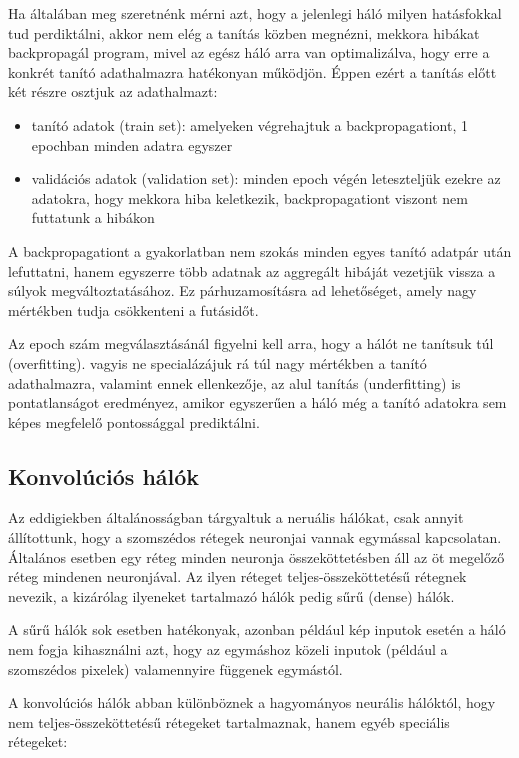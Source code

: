 \documentclass[12pt]{article}
\begin{document}
Ha általában meg szeretnénk mérni azt, hogy a jelenlegi háló milyen hatásfokkal tud perdiktálni, akkor nem elég a tanítás közben megnézni, mekkora hibákat backpropagál program, mivel az egész háló arra van optimalizálva, hogy erre a konkrét tanító adathalmazra hatékonyan működjön. Éppen ezért a tanítás előtt két részre osztjuk az adathalmazt:

\begin{itemize}  
	\item tanító adatok (train set): amelyeken végrehajtuk a backpropagationt, 1 epochban minden adatra egyszer
	\item validációs adatok (validation set): minden epoch végén leteszteljük ezekre az adatokra, hogy mekkora hiba keletkezik, backpropagationt viszont nem futtatunk a hibákon
\end{itemize}

A backpropagationt a gyakorlatban nem szokás minden egyes tanító adatpár után lefuttatni, hanem egyszerre több adatnak az aggregált hibáját vezetjük vissza a súlyok megváltoztatásához. Ez párhuzamosításra ad lehetőséget, amely nagy mértékben tudja csökkenteni a futásidőt.

Az epoch szám megválasztásánál figyelni kell arra, hogy a hálót ne tanítsuk túl (overfitting). vagyis ne specialázájuk rá túl nagy mértékben a tanító adathalmazra, valamint ennek ellenkezője, az alul tanítás (underfitting) is pontatlanságot eredményez, amikor egyszerűen a háló még a tanító adatokra sem képes megfelelő pontossággal prediktálni.

\subsection{Konvolúciós hálók}

Az eddigiekben általánosságban tárgyaltuk a neruális hálókat, csak annyit állítottunk, hogy a szomszédos rétegek neuronjai vannak egymással kapcsolatan. Általános esetben egy réteg minden neuronja összeköttetésben áll az öt megelőző réteg mindenen neuronjával. Az ilyen réteget teljes-összeköttetésű rétegnek nevezik, a kizárólag ilyeneket tartalmazó hálók pedig sűrű (dense) hálók.

A sűrű hálók sok esetben hatékonyak, azonban például kép inputok esetén a háló nem fogja kihasználni azt, hogy az egymáshoz közeli inputok (például a szomszédos pixelek) valamennyire függenek egymástól. 

A konvolúciós hálók abban különböznek a hagyományos neurális hálóktól, hogy nem teljes-összeköttetésű rétegeket tartalmaznak, hanem egyéb speciális rétegeket:
\end{document}
